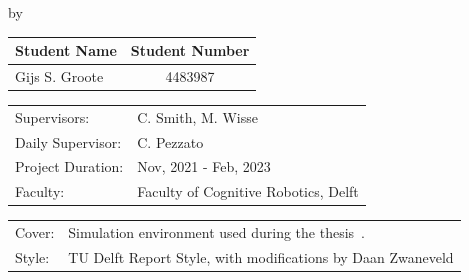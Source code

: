 \begin{titlepage}

\begin{center}

{\makeatletter
\largetitlestyle\fontsize{44}{44}\selectfont\@title
\makeatother}

{\makeatletter
\ifdefvoid{\@subtitle}{}{\bigskip\fontsize{16}{16}\selectfont\@subtitle}
\makeatother}

\bigskip
by
\bigskip

{\makeatletter
\largetitlestyle\fontsize{25}{25}\selectfont\@author
\makeatother}

\bigskip

\setlength\extrarowheight{2pt}
\begin{tabular}{lc}
    Student Name & Student Number \\\midrule
    Gijs S. Groote & 4483987 \\
\end{tabular}

\vfill

\begin{tabular}{ll}
    Supervisors: & C. Smith, M. Wisse \\
    Daily Supervisor: & C. Pezzato \\
    Project Duration: & Nov, 2021 - Feb, 2023 \\
    Faculty: & Faculty of Cognitive Robotics, Delft
\end{tabular}

\bigskip

\begin{tabular}{p{15mm}p{10cm}}
  Cover: & Simulation environment used during the thesis~\cite{spahn_urdfenvironment_2022}.\\
    Style: & TU Delft Report Style, with modifications by Daan Zwaneveld
\end{tabular}
\end{center}


\end{titlepage}
